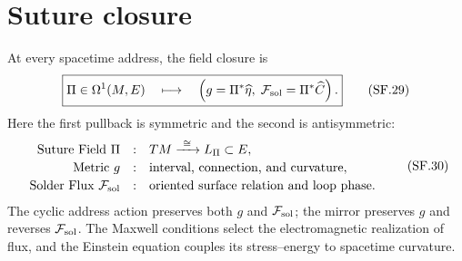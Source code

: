 \documentclass[10pt]{article}
\newcommand{\hateta}{\widehat\eta}
\newcommand{\hatC}{\widehat C}
\newcommand{\Fsol}{\mathcal F_{\rm sol}}
\begin{document}
\section{Suture closure}

At every spacetime address, the field closure is
\[
\boxed{
\Pi\in\Omega^1(M,E)
\quad\longmapsto\quad
\left(
g=\Pi^*\hateta,\;
\Fsol=\Pi^*\hatC
\right).}
\tag{SF.29}
\]
Here the first pullback is symmetric and the second is antisymmetric:
\[
\begin{array}{rcl}
\text{Suture Field }\Pi&:&TM\xrightarrow{\ \cong\ }L_\Pi\subset E,\\[2pt]
\text{Metric }g&:&\text{interval, connection, and curvature},\\[2pt]
\text{Solder Flux }\Fsol&:&\text{oriented surface relation and loop phase}.
\end{array}
\tag{SF.30}
\]
The cyclic address action preserves both $g$ and $\Fsol$; the mirror preserves
$g$ and reverses $\Fsol$. The Maxwell conditions select the electromagnetic
realization of flux, and the Einstein equation couples its stress--energy to
spacetime curvature.
\end{document}
